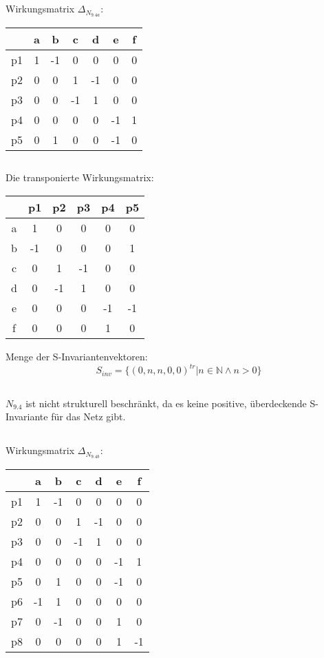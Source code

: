 \documentclass[10pt,a4paper,oneside,ngerman,numbers=noenddot]{scrartcl}
\begin{document}
\section{} %
\subsection{}
Wirkungsmatrix \(\Delta_{N_{9.4a}}\):

\begin{tabular}{c|cccccc}
	 & a & b & c & d & e & f \\
	\hline
	p1 & 1 & -1 & 0 & 0 & 0 & 0 \\
	p2 & 0 & 0 & 1 & -1 & 0 & 0 \\
	p3 & 0 & 0 & -1 & 1 & 0 & 0 \\
	p4 & 0 & 0 & 0 & 0 & -1 & 1 \\
	p5 & 0 & 1 & 0 & 0 & -1 & 0
\end{tabular}

\subsection{}
Die transponierte Wirkungsmatrix:

\begin{tabular}{c|ccccc}
	 & p1 & p2 & p3 & p4 & p5 \\
	\hline
	a & 1 & 0 & 0 & 0 & 0 \\
	b & -1 & 0 & 0 & 0 & 1 \\
	c & 0 & 1 & -1 & 0 & 0 \\
	d & 0 & -1 & 1 & 0 & 0 \\
	e & 0 & 0 & 0 & -1 & -1 \\
	f & 0 & 0 & 0 & 1 & 0
\end{tabular}

Menge der S-Invariantenvektoren:
\[
	S_{inv} = \{(0,n,n,0,0 )^{tr}| n \in \mathbb{N} \wedge n > 0 \}
\]

\subsection{}
\(N_{9.4}\) ist nicht strukturell beschränkt, da es keine positive, überdeckende S-Invariante für das Netz gibt.

\subsection{}
Wirkungsmatrix \(\Delta_{N_{9.4b}}\):

\begin{tabular}{c|cccccc}
	 & a & b & c & d & e & f \\
	\hline
	p1 & 1 & -1 & 0 & 0 & 0 & 0 \\
	p2 & 0 & 0 & 1 & -1 & 0 & 0 \\
	p3 & 0 & 0 & -1 & 1 & 0 & 0 \\
	p4 & 0 & 0 & 0 & 0 & -1 & 1 \\
	p5 & 0 & 1 & 0 & 0 & -1 & 0 \\
	p6 & -1 & 1 & 0 & 0 & 0 & 0 \\
	p7 & 0 & -1 & 0 & 0 & 1 & 0 \\
	p8 & 0 & 0 & 0 & 0 & 1 & -1
\end{tabular}
\end{document}
